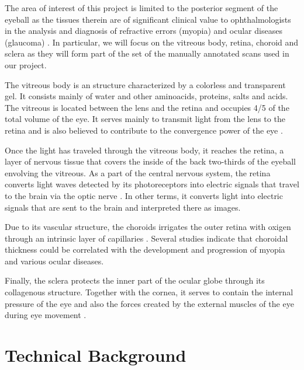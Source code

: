 \documentclass[12pt,a4paper]{scrartcl}
\begin{document}
The area of interest of this project is limited to the posterior segment of the eyeball as the tissues therein are of significant clinical value to ophthalmologists in the analysis and diagnosis of refractive errors (myopia) and ocular diseases (glaucoma) \cite{Ronchetti2017}. In particular, we will focus on the vitreous body, retina, choroid and sclera as they will form part of the set of the manually annotated scans used in our project. 

The vitreous body is an structure characterized by a colorless and transparent gel. It consists mainly of water and other aminoacids, proteins, salts and acids. The vitreous is located between the lens and the retina and occupies 4/5 of the total volume of the eye. It serves mainly to transmit light from the lens to the retina and is also believed to contribute to the convergence power of the eye \cite{snell1998}. 

Once the light has traveled through the vitreous body, it reaches the retina, a layer of nervous tissue that covers the inside of the back two-thirds of the eyeball envolving the vitreous. As a part of the central nervous system, the retina converts light waves detected by its photoreceptors into electric signals that travel to the brain via the optic nerve \cite{purves2001}. In other terms, it converts light into electric signals that are sent to the brain and interpreted there as images.

Due to its vascular structure, the choroid\textquotesingle s irrigates the outer retina with oxigen through an intrinsic layer of capillaries   \cite{snell1998, choroidExpl}. Several studies \cite{Ronchetti2019, Ronchetti2018, Ho2013} indicate that choroidal thickness could be correlated with the development and progression of myopia and various ocular diseases. 

Finally, the sclera protects the inner part of the ocular globe through its collagenous structure. Together with the cornea, it serves to contain the internal pressure of the eye and also the forces created by the external muscles of the eye during eye movement \cite{Meek2008}.

\section{Technical Background}\label{s:TechBack}
\end{document}
